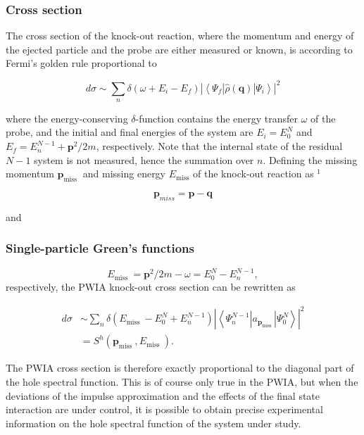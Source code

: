\documentclass[compress]{beamer}
\begin{document}
{
\frametitle{Cross section}
\begin{small}
{\scriptsize
The cross section of the knock-out reaction, where the momentum and
energy of the ejected particle and the probe are either measured or
known, is according to Fermi's golden rule proportional to

$$
d \sigma \sim \sum_{n} \delta\left(\omega+E_{i}-E_{f}\right)\left|\left\langle\Psi_{f}|\hat{\rho}(\boldsymbol{q})| \Psi_{i}\right\rangle\right|^{2}
$$

where the energy-conserving $\delta$-function contains the energy
transfer $\omega$ of the probe, and the initial and final energies of
the system are $E_{i}=E_{0}^{N}$ and
$E_{f}=E_{n}^{N-1}+\boldsymbol{p}^{2} / 2 m$, respectively. Note that
the internal state of the residual $N-1$ system is not measured, hence
the summation over $n$. Defining the missing momentum
$\boldsymbol{p}_{\text {miss }}$ and missing energy $E_{\text {miss
}}$ of the knock-out reaction as ${ }^{1}$

$$
\boldsymbol{p}_{m i s s}=\boldsymbol{p}-\boldsymbol{q}
$$

and

}
\end{small}
}
\frame
{
\frametitle{Single-particle Green's functions}
\begin{small}
{\scriptsize
$$
E_{\text {miss }}=\boldsymbol{p}^{2} / 2 m-\omega=E_{0}^{N}-E_{n}^{N-1},
$$
respectively, the PWIA knock-out cross section can be rewritten as

$$
\begin{aligned}
d \sigma & \sim \sum_{n} \delta\left(E_{\text {miss }}-E_{0}^{N}+E_{n}^{N-1}\right)\left|\left\langle\Psi_{n}^{N-1}\left|a_{\boldsymbol{p}_{\text {miss }}}\right| \Psi_{0}^{N}\right\rangle\right|^{2} \\
& =S^{h}\left(\boldsymbol{p}_{\text {miss }}, E_{\text {miss }}\right) .
\end{aligned}
$$

The PWIA cross section is therefore exactly proportional to the
diagonal part of the hole spectral function. This is of course only
true in the PWIA, but when the deviations of the impulse approximation
and the effects of the final state interaction are under control, it
is possible to obtain precise experimental information on the hole
spectral function of the system under study.
}
\end{small}
}
\end{document}
